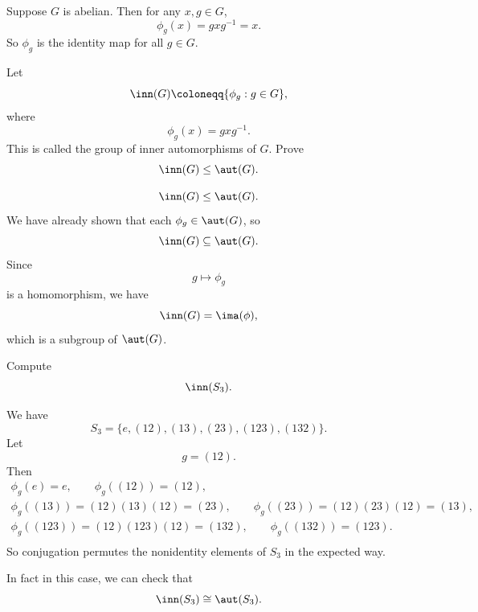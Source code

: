 Suppose $G$ is abelian.
Then for any $x,g\in G$,
\[
    \phi_g(x)=gxg^{-1}=x.
\]
So $\phi_g$ is the identity map for all $g\in G$.

\begin{example}
    Let
    \[
        \inn(G)\coloneqq \{\phi_g:g\in G\},
    \]
    where
    \[
        \phi_g(x)=gxg^{-1}.
    \]
    This is called the group of inner automorphisms of $G$.
    Prove
    \[
        \inn(G)\leq \aut(G).
    \]
\end{example}

\begin{proposition}{
    \[
        \inn(G)\leq \aut(G).
    \]
}
    We have already shown that each $\phi_g\in \aut(G)$, so
    \[
        \inn(G)\subseteq \aut(G).
    \]
    Since
    \[
        g\mapsto \phi_g
    \]
    is a homomorphism, we have
    \[
        \inn(G)=\ima(\phi),
    \]
    which is a subgroup of $\aut(G)$.
\end{proposition}

\begin{example}
    Compute
    \[
        \inn(S_3).
    \]
\end{example}

\begin{example}
    We have
    \[
        S_3=\{e,(12),(13),(23),(123),(132)\}.
    \]
    Let
    \[
        g=(12).
    \]
    Then
    \begin{gather*}
        \phi_g(e)=e,
        \qquad
        \phi_g((12))=(12),\\
        \phi_g((13))=(12)(13)(12)=(23),
        \qquad
        \phi_g((23))=(12)(23)(12)=(13),\\
        \phi_g((123))=(12)(123)(12)=(132),
        \qquad
        \phi_g((132))=(123).\\
    \end{gather*}
    So conjugation permutes the nonidentity elements of $S_3$ in the expected way.
\end{example}

In fact in this case, we can check that
\[
    \inn(S_3)\cong \aut(S_3).
\]
